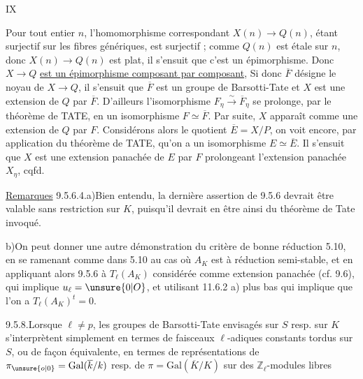\hfill IX

Pour tout entier $n$, l'homomorphisme correspondant $X(n)\longrightarrow Q(n)$, étant surjectif sur les fibres génériques, est surjectif ; comme $Q(n)$ est étale sur $n$, donc $X(n)\longrightarrow Q(n)$ est plat, il s'ensuit que c'est un épimorphisme. Donc $X\longrightarrow Q$ \uline{est un épimorphisme composant par composant}, Si donc $\overline F$ désigne le noyau de $X\longrightarrow Q$, il s'ensuit que $\overline F$ est un groupe de Barsotti-Tate et $X$ est une extension de $Q$ par $\overline F$. D'ailleurs l'isomorphisme $F_\eta\overset{\sim}{\longrightarrow}\overline F_\eta$ se prolonge, par le théorème de TATE, en un isomorphisme $F\simeq\overline F$. Par suite, $X$ apparaît comme une extension de $Q$ par $F$. Considérons alors le quotient $\overline E=X/P$, on voit encore, par application du théorème de TATE, qu'on a un isomorphisme $E\simeq\overline E$. Il s'ensuit que $X$ est une extension panachée de $E$ par $F$ prolongeant l'extension panachée $X_\eta$, cqfd.

\uline{Remarques} 9.5.6.4.\quad a)\quad Bien entendu, la dernière assertion de 9.5.6 devrait être valable sans restriction sur $K$, puisqu'il devrait en être ainsi du théorème de Tate invoqué.

b)\quad On peut donner une autre démonstration du critère de bonne réduction 5.10, en se ramenant comme dans 5.10 au cas où $A_K$ est à réduction semi-stable, et en appliquant alors 9.5.6 à $T_\ell(A_K)$ considérée comme extension panachée (cf. 9.6), qui implique $u_\ell=\unsure{0|O}$, et utilisant 11.6.2 a) plus bas qui implique que l'on a $T_\ell(A_K)^t=0$.

9.5.8.\quad Lorsque $\ell\neq p$, les groupes de Barsotti-Tate envisagés sur $S$ resp. sur $K$ s'interprètent simplement en termes de faisceaux $\ell$-adiques constants tordus sur $S$, ou de façon équivalente, en termes de représentations de $\pi_{\unsure{o|0}}=\mathrm{Gal}(\overline k/k)$ resp. de $\pi=\mathrm{Gal}(\overline K/K)$ sur des $\mathbb Z_\ell$-modules libres
